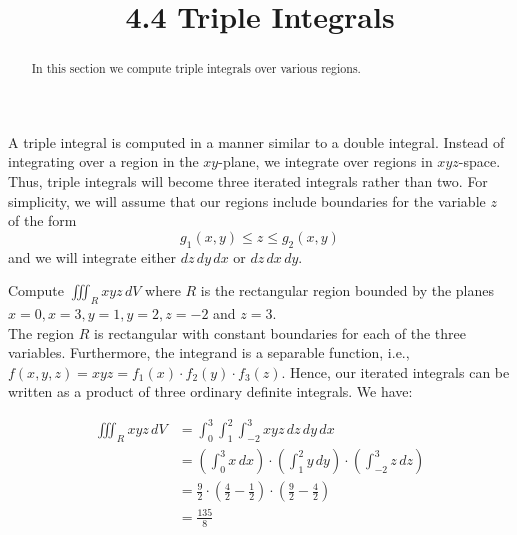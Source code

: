 \documentclass[handout]{ximera}
\title{4.4 Triple Integrals}
\begin{document}
\begin{abstract}
In this section we compute triple integrals over various regions.
\end{abstract}
 
\maketitle

A triple integral is computed in a manner similar to a double integral.  Instead of integrating over a region in the $xy$-plane,
we integrate over regions in $xyz$-space.  Thus, triple integrals will become three iterated integrals rather than two.
For simplicity, we will assume that our regions include boundaries for the variable $z$ of the form 
\[
g_1(x,y) \leq z \leq g_2(x,y)
\]
and we will integrate either $dz\, dy\, dx$ or $dz\, dx\, dy$.


\begin{example}[Example 1]
Compute $\iiint_R xyz \, dV$ where $R$ is the rectangular region bounded by the 
planes $x = 0, x = 3, y = 1, y = 2, z = -2$ and $z = 3$.\\
The region $R$ is rectangular with constant boundaries for each of the three variables.  Furthermore, the integrand
is a separable function, i.e., $f(x,y,z) = xyz = f_1(x) \cdot f_2(y) \cdot f_3(z)$. Hence, our iterated integrals can 
be written as a product of three ordinary definite integrals. We have:

\begin{align*}
\iiint_R xyz \, dV & = \int_0^3\int_1^2 \int_{-2}^3 xyz \,dz\, dy \, dx\\
                 & =\left(\int_0^3 x \, dx \right) \cdot \left(\int_1^2 y\, dy\right) \cdot \left(\int_{-2}^3z \,dz \right)\\
                 & = \frac92 \cdot \left(\frac{4}{2} -\frac12\right) \cdot \left(\frac92 - \frac42\right)\\
                 &=  \frac{135}{8}
\end{align*}      

\end{example}
\end{document}
